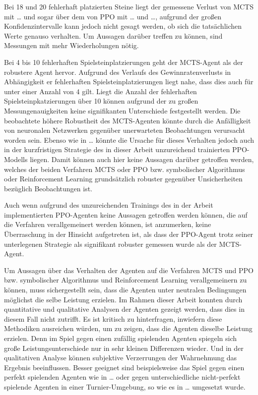 Bei 18 und 20 fehlerhaft platzierten Steine liegt der gemessene Verlust von MCTS mit … und sogar über dem von PPO mit … und …, aufgrund der großen Konfidenzintervalle kann jedoch nicht gesagt werden, ob sich die tatsächlichen Werte genauso verhalten. Um Aussagen darüber treffen zu können, sind Messungen mit mehr Wiederholungen nötig.

Bei 4 bis 10 fehlerhaften Spielsteinplatzierungen geht der MCTS-Agent als der robustere Agent hervor. Aufgrund des Verlaufs des Gewinnratenverlusts in Abhängigkeit er fehlerhaften Spielsteinplatzierungen liegt nahe, dass dies auch für unter einer Anzahl von 4 gilt. Liegt die Anzahl der fehlerhaften Spielsteinpkatzierungen über 10 können aufgrund der zu großen Messungenauigkeiten keine signifikanten Unterschiede festgestellt werden. Die beobachtete höhere Robustheit des MCTS-Agenten könnte durch die Anfälligkeit von neuronalen Netzwerken gegenüber unerwarteten Beobachtungen verursacht worden sein. Ebenso wie in … könnte die Ursache für dieses Verhalten jedoch auch in der kurzfristigen Strategie des in dieser Arbeit unzureichend trainierten PPO-Modells liegen. Damit können auch hier keine Aussagen darüber getroffen werden, welches der beiden Verfahren MCTS oder PPO bzw. symbolischer Algorithmus oder Reinforcement Learning grundsätzlich robuster gegenüber Unsicherheiten bezüglich Beobachtungen ist.

Auch wenn aufgrund des unzureichenden Trainings des in der Arbeit implementierten PPO-Agenten keine Aussagen getroffen werden können, die auf die Verfahren verallgemeinert werden können, ist anzumerken, keine Überraschung in der Hinsicht aufgetreten ist, als dass der PPO-Agent trotz seiner unterlegenen Strategie als signifikant robuster gemessen wurde als der MCTS-Agent.

Um Aussagen über das Verhalten der Agenten auf die Verfahren MCTS und PPO bzw. symbolischer Algorithmus und Reinforcement Learning verallgemeinern zu können, muss sichergestellt sein, dass die Agenten unter neutralen Bedingungen möglichst die selbe Leistung erzielen. Im Rahmen dieser Arbeit konnten durch quantitative und qualitative Analysen der Agenten gezeigt werden, dass dies in diesem Fall nicht zutrifft. Es ist kritisch zu hinterfragen, inwiefern diese Methodiken ausreichen würden, um zu zeigen, dass die Agenten dieselbe Leistung erzielen. Denn im Spiel gegen einen zufällig spielenden Agenten spiegeln sich große Leistungsunterschiede nur in sehr kleinen Differenzen wieder. Und in der qualitativen Analyse können subjektive Verzerrungen der Wahrnehmung das Ergebnis beeinflussen. Besser geeignet sind beispielsweise das Spiel gegen einen perfekt spielenden Agenten wie in … oder gegen unterschiedliche nicht-perfekt spielende Agenten in einer Turnier-Umgebung, so wie es in … umgesetzt wurde.



